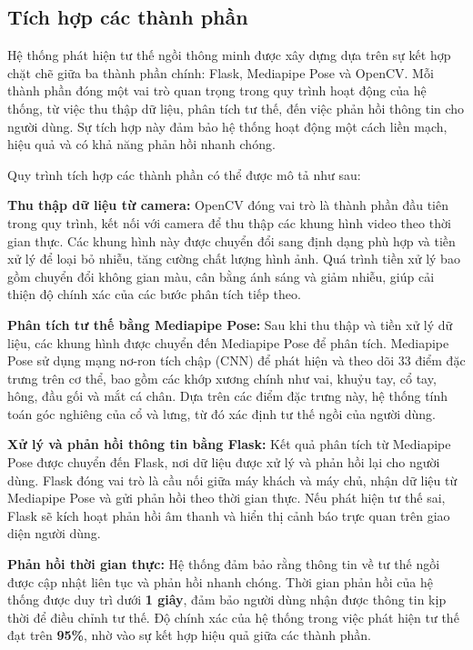 \documentclass[conference]{IEEEtran}
\begin{document}
\subsection{Tích hợp các thành phần}
Hệ thống phát hiện tư thế ngồi thông minh được xây dựng dựa trên sự kết hợp chặt chẽ giữa ba thành phần chính: Flask, Mediapipe Pose và OpenCV. Mỗi thành phần đóng một vai trò quan trọng trong quy trình hoạt động của hệ thống, từ việc thu thập dữ liệu, phân tích tư thế, đến việc phản hồi thông tin cho người dùng. Sự tích hợp này đảm bảo hệ thống hoạt động một cách liền mạch, hiệu quả và có khả năng phản hồi nhanh chóng.

Quy trình tích hợp các thành phần có thể được mô tả như sau:

 \textbf{Thu thập dữ liệu từ camera:} OpenCV đóng vai trò là thành phần đầu tiên trong quy trình, kết nối với camera để thu thập các khung hình video theo thời gian thực. Các khung hình này được chuyển đổi sang định dạng phù hợp và tiền xử lý để loại bỏ nhiễu, tăng cường chất lượng hình ảnh. Quá trình tiền xử lý bao gồm chuyển đổi không gian màu, cân bằng ánh sáng và giảm nhiễu, giúp cải thiện độ chính xác của các bước phân tích tiếp theo.

 \textbf{Phân tích tư thế bằng Mediapipe Pose:} Sau khi thu thập và tiền xử lý dữ liệu, các khung hình được chuyển đến Mediapipe Pose để phân tích. Mediapipe Pose sử dụng mạng nơ-ron tích chập (CNN) để phát hiện và theo dõi 33 điểm đặc trưng trên cơ thể, bao gồm các khớp xương chính như vai, khuỷu tay, cổ tay, hông, đầu gối và mắt cá chân. Dựa trên các điểm đặc trưng này, hệ thống tính toán góc nghiêng của cổ và lưng, từ đó xác định tư thế ngồi của người dùng.
 
  \textbf{Xử lý và phản hồi thông tin bằng Flask:} Kết quả phân tích từ Mediapipe Pose được chuyển đến Flask, nơi dữ liệu được xử lý và phản hồi lại cho người dùng. Flask đóng vai trò là cầu nối giữa máy khách và máy chủ, nhận dữ liệu từ Mediapipe Pose và gửi phản hồi theo thời gian thực. Nếu phát hiện tư thế sai, Flask sẽ kích hoạt phản hồi âm thanh và hiển thị cảnh báo trực quan trên giao diện người dùng.
 
  \textbf{Phản hồi thời gian thực:} Hệ thống đảm bảo rằng thông tin về tư thế ngồi được cập nhật liên tục và phản hồi nhanh chóng. Thời gian phản hồi của hệ thống được duy trì dưới \textbf{1 giây}, đảm bảo người dùng nhận được thông tin kịp thời để điều chỉnh tư thế. Độ chính xác của hệ thống trong việc phát hiện tư thế đạt trên \textbf{95\%}, nhờ vào sự kết hợp hiệu quả giữa các thành phần.
\end{document}
